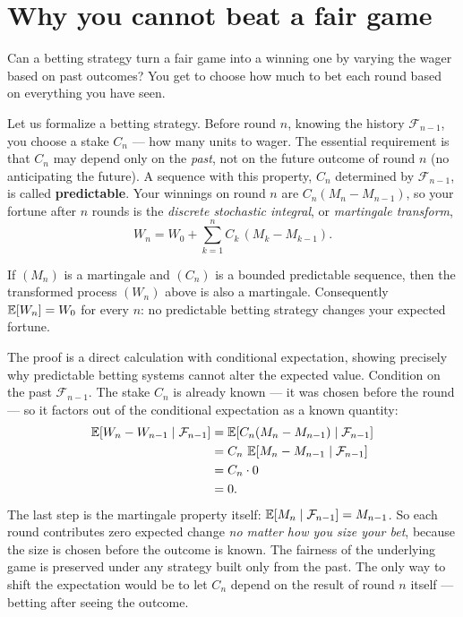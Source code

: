 \section{Why you cannot beat a fair game}
\label{ch28:cannot-beat}

Can a betting strategy turn a fair game into a winning one by varying the wager based on past
outcomes? You get to choose how much to bet each round based on everything you have seen.

Let us formalize a betting strategy. Before round $n$, knowing the history $\mathcal{F}_{n-1}$, you choose
a stake $C_n$ --- how many units to wager. The essential requirement is that $C_n$ may depend only on the
\emph{past}, not on the future outcome of round $n$ (no anticipating the future). A sequence with this
property, $C_n$ determined by $\mathcal{F}_{n-1}$, is called \textbf{predictable}. Your winnings on
round $n$ are $C_n(M_n - M_{n-1})$, so your fortune after $n$ rounds is the \emph{discrete stochastic
integral}, or \emph{martingale transform},
\[
  W_n = W_0 + \sum_{k=1}^{n} C_k\,(M_k - M_{k-1}).
\]

\begin{theorem}
\label{ch28:thm-transform}
If $(M_n)$ is a martingale and $(C_n)$ is a bounded predictable sequence, then the transformed process
$(W_n)$ above is also a martingale. Consequently $\operatorname{\mathbb{E}}[W_n] = W_0$ for every $n$: no predictable betting
strategy changes your expected fortune.
\end{theorem}

\begin{whybox}
The proof is a direct calculation with conditional expectation, showing precisely why predictable betting
systems cannot alter the expected value. Condition on the past $\mathcal{F}_{n-1}$.
The stake $C_n$ is already known --- it was chosen before the round --- so it factors out of the
conditional expectation as a known quantity:
\begin{align*}
  \operatorname{\mathbb{E}}[W_n - W_{n-1}\mid\mathcal{F}_{n-1}]
  &= \operatorname{\mathbb{E}}[C_n(M_n - M_{n-1})\mid\mathcal{F}_{n-1}] \\
  &= C_n\,\operatorname{\mathbb{E}}[M_n - M_{n-1}\mid\mathcal{F}_{n-1}] \\
  &= C_n \cdot 0 \\
  &= 0.
\end{align*}
The last step is the martingale property itself: $\operatorname{\mathbb{E}}[M_n \mid \mathcal{F}_{n-1}] = M_{n-1}$. So each
round contributes zero expected change \emph{no matter how you size your bet}, because the size is chosen
before the outcome is known. The fairness of the underlying game is preserved under any strategy built only
from the past. The only way to shift the expectation would be to let $C_n$ depend on the result of round $n$
itself --- betting after seeing the outcome.
\end{whybox}

